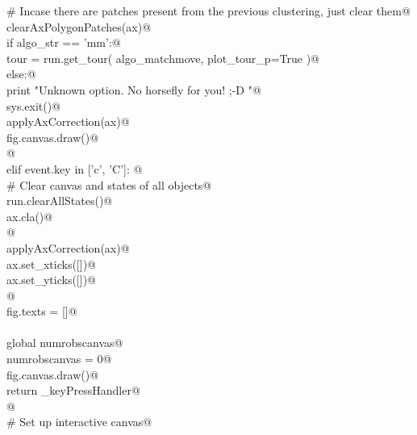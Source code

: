 \documentclass[10pt, english, oneside]{report}
\begin{document}
\begin{appendices}
\begin{flushleft}
\begin{list}{}{}
\mbox{}\verb@                    # Incase there are patches present from the previous clustering, just clear them@\\
\mbox{}\verb@                    clearAxPolygonPatches(ax)@\\
\mbox{}\verb@                    if   algo_str == 'mm':@\\
\mbox{}\verb@                          tour = run.get_tour( algo_matchmove, plot_tour_p=True )@\\
\mbox{}\verb@                    else:@\\
\mbox{}\verb@                          print "Unknown option. No horsefly for you! ;-D "@\\
\mbox{}\verb@                          sys.exit()@\\
\mbox{}\verb@                    applyAxCorrection(ax)@\\
\mbox{}\verb@                    fig.canvas.draw()@\\
\mbox{}\verb@                    @\\
\mbox{}\verb@               elif event.key in ['c', 'C']: @\\
\mbox{}\verb@                    # Clear canvas and states of all objects@\\
\mbox{}\verb@                    run.clearAllStates()@\\
\mbox{}\verb@                    ax.cla()@\\
\mbox{}\verb@                                  @\\
\mbox{}\verb@                    applyAxCorrection(ax)@\\
\mbox{}\verb@                    ax.set_xticks([])@\\
\mbox{}\verb@                    ax.set_yticks([])@\\
\mbox{}\verb@                                     @\\
\mbox{}\verb@                    fig.texts = []@\\
\mbox{}\verb@@\\
\mbox{}\verb@                    global numrobscanvas@\\
\mbox{}\verb@                    numrobscanvas = 0@\\
\mbox{}\verb@                    fig.canvas.draw()@\\
\mbox{}\verb@           return _keyPressHandler@\\
\mbox{}\verb@    @\\
\mbox{}\verb@    # Set up interactive canvas@\\

\end{list}
\end{flushleft}
\end{appendices}
\end{document}
